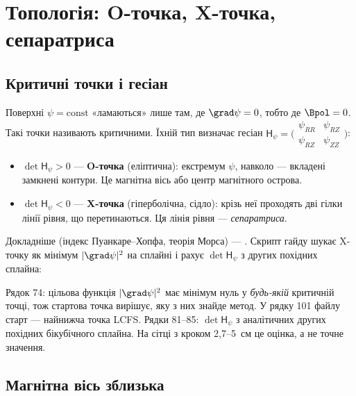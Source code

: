\chapter{Топологія: O-точка, X-точка, сепаратриса}\label{ch:geo5}

\section{Критичні точки і гесіан}\label{sec:geo5-crit}

Поверхні $\psi=\text{const}$ «ламаються» лише там, де $\grad\psi=0$, тобто де $\Bpol=0$. Такі точки називають критичними. Їхній тип визначає гесіан $\mathsf{H}_\psi=\bigl(\begin{smallmatrix}\psi_{RR}&\psi_{RZ}\\\psi_{RZ}&\psi_{ZZ}\end{smallmatrix}\bigr)$:
\begin{itemize}
\item $\det\mathsf{H}_\psi>0$ --- \textbf{O-точка} (еліптична): екстремум $\psi$, навколо --- вкладені замкнені контури. Це магнітна вісь або центр магнітного острова.
\item $\det\mathsf{H}_\psi<0$ --- \textbf{X-точка} (гіперболічна, сідло): крізь неї проходять дві гілки лінії рівня, що перетинаються. Ця лінія рівня --- \emph{сепаратриса}.
\end{itemize}
Докладніше (індекс Пуанкаре--Хопфа, теорія Морса) --- \cite[розд.~4, п.~4.4]{Manual}. Скрипт гайду шукає X-точку як мінімум $|\grad\psi|^2$ на сплайні і рахує $\det\mathsf{H}_\psi$ з других похідних сплайна:


\noindent Рядок 74: цільова функція $|\grad\psi|^2$ має мінімум нуль у \emph{будь-якій} критичній точці, тож стартова точка вирішує, яку з них знайде метод. У рядку 101 файлу старт --- найнижча точка LCFS. Рядки 81--85: $\det\mathsf{H}_\psi$ з аналітичних других похідних бікубічного сплайна. На сітці з кроком 2,7--5~см це оцінка, а не точне значення.

\section{Магнітна вісь зблизька}\label{sec:geo5-axis}

